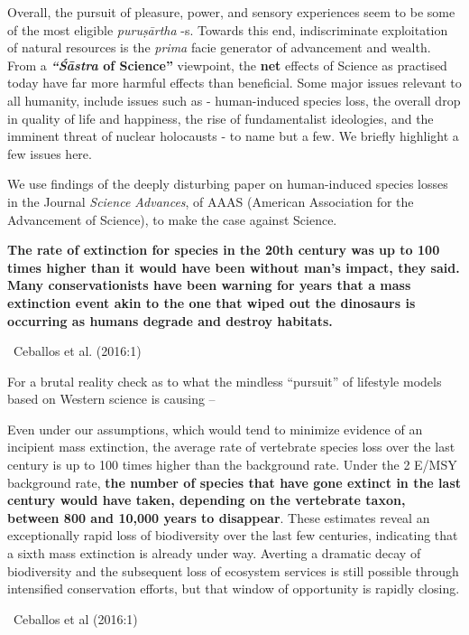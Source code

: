 Overall, the pursuit of pleasure, power, and sensory experiences seem to be some of the most eligible \textit{puruṣārtha} -s. Towards this end, indiscriminate exploitation of natural resources is the \textit{prima} facie generator of advancement and wealth. From a \textbf{\textit{“Śāstra} of Science”} viewpoint, the \textbf{net} effects of Science as practised today have far more harmful effects than beneficial. Some major issues relevant to all humanity, include issues such as - human-induced species loss, the overall drop in quality of life and happiness, the rise of fundamentalist ideologies, and the imminent threat of nuclear holocausts - to name but a few. We briefly highlight a few issues here.

We use findings of the deeply disturbing paper on human-induced species losses in the Journal \textit{Science Advances}, of AAAS (American Association for the Advancement of Science), to make the case against Science.

\begin{myquote}
\textbf{The rate of extinction for species in the 20th century was up to 100 times higher than it would have been without man’s impact, they said. Many conservationists have been warning for years that a mass extinction event akin to the one that wiped out the dinosaurs is occurring as humans degrade and destroy habitats.}

~\hfill Ceballos et al. (2016:1)
\end{myquote}

For a brutal reality check as to what the mindless “pursuit” of lifestyle models based on Western science is causing –

\begin{myquote}
Even under our assumptions, which would tend to minimize evidence of an incipient mass extinction, the average rate of vertebrate species loss over the last century is up to 100 times higher than the background rate. Under the 2 E/MSY background rate, \textbf{the number of species that have gone extinct in the last century would have taken, depending on the vertebrate taxon, between 800 and 10,000 years to disappear}. These estimates reveal an exceptionally rapid loss of biodiversity over the last few centuries, indicating that a sixth mass extinction is already under way. Averting a dramatic decay of biodiversity and the subsequent loss of ecosystem services is still possible through intensified conservation efforts, but that window of opportunity is rapidly closing.

~\hfill Ceballos et al (2016:1)
\end{myquote}

